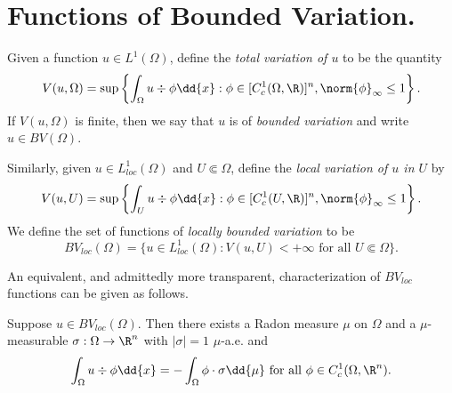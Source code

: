 \documentclass[../main.tex]{subfiles}
\begin{document}
\section{Functions of Bounded Variation.}
\begin{definition}\label{def:BV}
    Given a function $ u\in L^{1}(\Omega) $, define the \textit{total variation of $ u $} to be the quantity
    \[
        V(u,\Omega) = \sup\left\{ \int_{\Omega} u\div{\phi}\dd{x} : \phi\in[C_{c}^{1}(\Omega,\R)]^{n}, \norm{\phi}_{\infty} \leq 1 \right\}.
    \]
    If $ V(u,\Omega) $ is finite, then we say that $ u $ is of \textit{bounded variation} and write $ u\in BV(\Omega) $. 
\end{definition}

\begin{definition}\label{def:BVloc}
    Similarly, given $ u\in L^{1}_{loc}(\Omega) $ and $ U\Subset \Omega $, define the \textit{local variation of $ u $ in $ U $} by
    \[
        V(u, U) = \sup\left\{ \int_{U} u\div{\phi}\dd{x} : \phi\in[C_{c}^{1}(U,\R)]^{n}, \norm{\phi}_{\infty} \leq 1 \right\}.
    \]
    We define the set of functions of \textit{locally bounded variation} to be
    \[
        BV_{loc}(\Omega) = \{u\in L^{1}_{loc}(\Omega) : V(u,U)< +\infty \text{ for all } U\Subset \Omega\}.
    \]
\end{definition}

An equivalent, and admittedly more transparent, characterization of $ BV_{loc} $ functions can be given as follows. 

\begin{proposition}\label{bvchar}
    Suppose $ u\in BV_{loc}(\Omega) $. Then there exists a Radon measure $ \mu $ on $ \Omega $ and a $ \mu $-measurable $ \sigma:\Omega\to \R^{n} $ with $ | \sigma| = 1$ $ \mu $-a.e. and
    \[
        \int_{\Omega} u\div{\phi}\dd{x} = -\int_{\Omega} \phi\cdot \sigma \dd{\mu} \text{ for all } \phi\in C_{c}^{1}(\Omega,\R^{n}).
    \]
\end{proposition}
\end{document}
